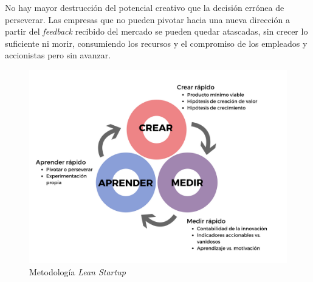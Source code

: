 No hay mayor destrucción del potencial creativo que la decisión errónea de perseverar. Las empresas que no pueden pivotar hacia una nueva dirección a partir del \textit{feedback} recibido del mercado se pueden quedar atascadas, sin crecer lo suficiente ni morir, consumiendo los recursos y el compromiso de los empleados y accionistas pero sin avanzar\cite{ericries2011}.

\begin{figure}[htbp] 
    \centering
    \includegraphics[width=1\textwidth]{figuras/lean_startup.png}
    \caption{Metodología \textit{Lean Startup}}
    \label{fig:lean_startup}
\end{figure}	



